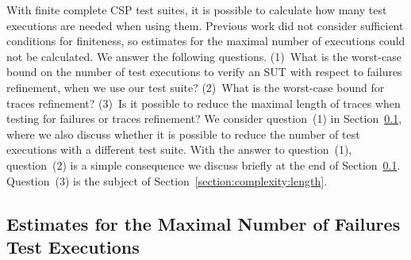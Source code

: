 \documentclass[3p,times]{elsarticle}
\newcommand{\epass}{{\text{\it pass}}}
\newcommand{\minhits}{\text{\it minHit}}
\begin{document}

With finite complete CSP test suites, it is possible to calculate how
many test executions are needed when using them. Previous work did not
consider sufficient conditions for finiteness, so estimates for the maximal
number of executions could not be calculated. We answer the following
questions. (1)~What is the worst-case bound on the number of test executions
to verify an SUT with respect to failures refinement, when we
use our test suite? (2)~What is the worst-case bound for traces refinement?
(3)~Is it possible to reduce the maximal length of traces when testing for
failures or traces refinement? We consider question~(1) in
Section~\ref{section:complexity:failures}, where we also discuss whether it
is possible to reduce the number of test executions with a different test
suite.  With the answer to question~(1), question~(2) is a simple consequence
we discuss briefly at the end of Section~\ref{section:complexity:failures}.
Question~(3) is the subject of Section~\ref{section:complexity:length}.

\subsection{Estimates for the Maximal Number of Failures Test Executions}
\label{section:complexity:failures}
\end{document}
